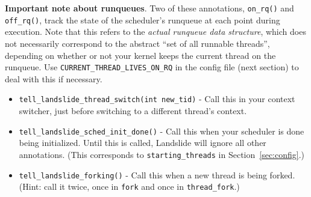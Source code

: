 \documentclass{article}
\begin{document}
{\bf Important note about runqueues}.
Two of these annotations, \texttt{on\_rq()} and \texttt{off\_rq()}, track the state of the scheduler's runqueue at each point during execution.
Note that this refers to the {\em actual runqueue data structure}, which does not necessarily correspond to the abstract ``set of all runnable threads'', depending on whether or not your kernel keeps the current thread on the runqueue. Use \texttt{CURRENT\_THREAD\_LIVES\_ON\_RQ} in the config file (next section) to deal with this if necessary.

\begin{itemize}
	\item \texttt{tell\_landslide\_thread\_switch(int new\_tid)} - Call this in your context switcher, just before switching to a different thread's context.
	\item \texttt{tell\_landslide\_sched\_init\_done()} - Call this when your scheduler is done being initialized. Until this is called, Landslide will ignore all other annotations. (This corresponds to \texttt{starting\_threads} in Section~\ref{sec:config}.)
	\item \texttt{tell\_landslide\_forking()} - Call this when a new thread is being forked.
		(Hint: call it twice, once in \texttt{fork} and once in \texttt{thread\_fork}.)


\end{itemize}
\end{document}
